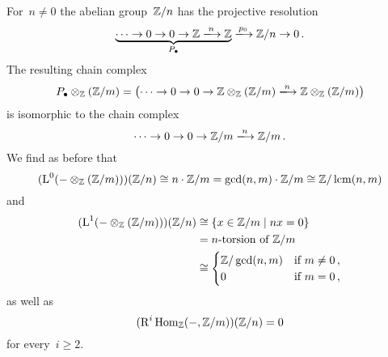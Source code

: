 For~$n \neq 0$ the abelian group~$\mathbb{Z}/n$ has the projective resolution
\[
  \underbrace{
  \dotsb
  \to
  0
  \to
  0
  \to
  \Integer
  \xlongto{n}
  \Integer
  }_{\Pcc}
  \xlongto{p_0}
  \Integer/n
  \to
  0 \,.
\]
The resulting chain complex
\[
  \Pcc \tensor_\Integer (\Integer/m)
  =
  \bigl(
    \dotsb
    \to
    0
    \to
    0
    \to
    \Integer \tensor_\Integer (\Integer/m)
    \xlongto{n}
    \Integer \tensor_\Integer (\Integer/m)
  \bigr)
\]
is isomorphic to the chain complex
\[
  \dotsb
  \to
  0
  \to
  0
  \to
  \Integer/m
  \xlongto{n}
  \Integer/m \,.
\]
We find as before that
\[
  ( \operatorname{L}^0 (- \otimes_{\mathbb{Z}} (\mathbb{Z}/m)) )(\mathbb{Z}/n)
  \cong
  n \cdot \mathbb{Z}/m
  =
  \gcd(n,m) \cdot \mathbb{Z}/m
  \cong
  \mathbb{Z}/\operatorname{lcm}(n,m)
\]
and
\begin{align*}
  ( \Left^1 (- \tensor_\Integer (\Integer/m)) )(\Integer/n)
  &\cong
  \{
  x \in \Integer/m
  \suchthat
  nx = 0  
  \}
  \\
  &=
  \text{\dash{$n$}{torsion} of~$\Integer/m$}
  \\
  &\cong
  \begin{cases}
    \Integer/\gcd(n,m)  & \text{if~$m \neq 0$}  \,, \\
    0                   & \text{if~$m = 0$}     \,,
  \end{cases}
\end{align*}
as well as
\[
  ( \operatorname{R}^i \operatorname{Hom}_{\mathbb{Z}}(-,\mathbb{Z}/m) )(\mathbb{Z}/n)
  = 0
\]
for every~$i \geq 2$.




